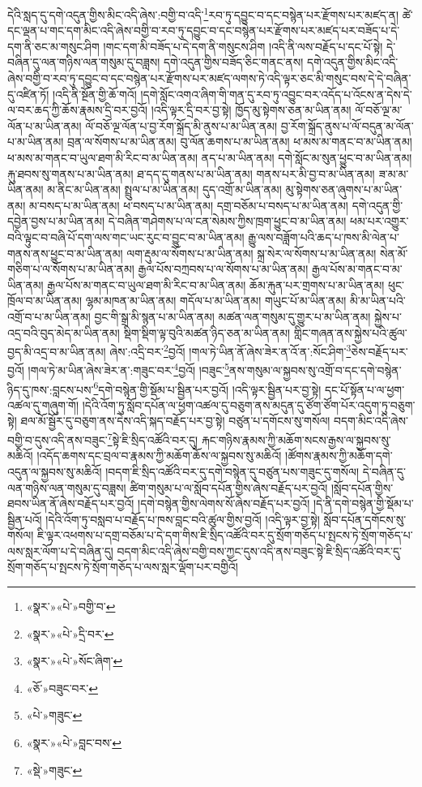 དེའི་སླད་དུ་དགེ་འདུན་གྱིས་མིང་འདི་ཞེས་:བགྱི་བ་འདི་\footnote{«སྣར་»«པེ་»བགྱི་བ་}རབ་ཏུ་དབྱུང་བ་དང་བསྙེན་པར་རྫོགས་པར་མཛད་ན། ཚེ་དང་ལྡན་པ་གང་དག་མིང་འདི་ཞེས་བགྱི་བ་རབ་ཏུ་དབྱུང་བ་དང་བསྙེན་པར་རྫོགས་པར་མཛད་པར་བཟོད་པ་དེ་དག་ནི་ཅང་མ་གསུང་ཤིག །གང་དག་མི་བཟོད་པ་དེ་དག་ནི་གསུངས་ཤིག །འདི་ནི་ལས་བརྗོད་པ་དང་པོ་སྟེ། དེ་བཞིན་དུ་ལན་གཉིས་ལན་གསུམ་དུ་བཟླས། དགེ་འདུན་གྱིས་བཟོད་ཅིང་གནང་ནས། དགེ་འདུན་གྱིས་མིང་འདི་ཞེས་བགྱི་བ་རབ་ཏུ་དབྱུང་བ་དང་བསྙེན་པར་རྫོགས་པར་མཛད་ལགས་ཏེ་འདི་ལྟར་ཅང་མི་གསུང་བས་དེ་དེ་བཞིན་དུ་འཛིན་ཏོ། །འདི་ནི་སྔོན་གྱི་ཆོ་གའོ། །དགེ་སློང་འགའ་ཞིག་གི་གན་དུ་རབ་ཏུ་འབྱུང་བར་འདོད་པ་འོངས་ན་དེས་དེ་ལ་བར་ཆད་ཀྱི་ཆོས་རྣམས་དྲི་བར་བྱའོ། །འདི་ལྟར་དྲི་བར་བྱ་སྟེ། ཁྱོད་མུ་སྟེགས་ཅན་མ་ཡིན་ནམ། ལོ་བཅོ་ལྔ་མ་ལོན་པ་མ་ཡིན་ནམ། ལོ་བཅོ་ལྔ་ལོན་པ་བྱ་རོག་སྐྲོད་མི་ནུས་པ་མ་ཡིན་ནམ། བྱ་རོག་སྐྲོད་ནུས་པ་ལོ་བདུན་མ་ལོན་པ་མ་ཡིན་ནམ། བྲན་ལ་སོགས་པ་མ་ཡིན་ནམ། བུ་ལོན་ཆགས་པ་མ་ཡིན་ནམ། ཕ་མས་མ་གནང་བ་མ་ཡིན་ནམ། ཕ་མས་མ་གནང་བ་ཡུལ་ཐག་མི་རིང་བ་མ་ཡིན་ནམ། ནད་པ་མ་ཡིན་ནམ། དགེ་སློང་མ་སུན་ཕྱུང་བ་མ་ཡིན་ནམ། རྐུ་ཐབས་སུ་གནས་པ་མ་ཡིན་ནམ། ཐ་དད་དུ་གནས་པ་མ་ཡིན་ནམ། གནས་པར་མི་བྱ་བ་མ་ཡིན་ནམ། ཟ་མ་མ་ཡིན་ནམ། མ་ནིང་མ་ཡིན་ནམ། སྤྲུལ་པ་མ་ཡིན་ནམ། དུད་འགྲོ་མ་ཡིན་ནམ། མུ་སྟེགས་ཅན་ཞུགས་པ་མ་ཡིན་ནམ། མ་བསད་པ་མ་ཡིན་ནམ། ཕ་བསད་པ་མ་ཡིན་ནམ། དགྲ་བཅོམ་པ་བསད་པ་མ་ཡིན་ནམ། དགེ་འདུན་གྱི་དབྱེན་བྱས་པ་མ་ཡིན་ནམ། དེ་བཞིན་གཤེགས་པ་ལ་ངན་སེམས་ཀྱིས་ཁྲག་ཕྱུང་བ་མ་ཡིན་ནམ། ཕམ་པར་འགྱུར་བའི་ལྟུང་བ་བཞི་པོ་དག་ལས་གང་ཡང་རུང་བ་བྱུང་བ་མ་ཡིན་ནམ། རྒྱུ་ལས་བཟློག་པའི་ཆད་པ་ཁས་མི་ལེན་པ་གནས་ནས་ཕྱུང་བ་མ་ཡིན་ནམ། ལག་རྡུམ་ལ་སོགས་པ་མ་ཡིན་ནམ། སྐྲ་སེར་ལ་སོགས་པ་མ་ཡིན་ནམ། སེན་མོ་གཅིག་པ་ལ་སོགས་པ་མ་ཡིན་ནམ། རྒྱལ་པོས་བཀྲབས་པ་ལ་སོགས་པ་མ་ཡིན་ནམ། རྒྱལ་པོས་མ་གནང་བ་མ་ཡིན་ནམ། རྒྱལ་པོས་མ་གནང་བ་ཡུལ་ཐག་མི་རིང་བ་མ་ཡིན་ནམ། ཆོམ་རྐུན་པར་གྲགས་པ་མ་ཡིན་ནམ། ཕུང་ཁྲོལ་བ་མ་ཡིན་ནམ། ལྷམ་མཁན་མ་ཡིན་ནམ། གདོལ་པ་མ་ཡིན་ནམ། གཡུང་པོ་མ་ཡིན་ནམ། མི་མ་ཡིན་པའི་འགྲོ་བ་པ་མ་ཡིན་ནམ། བྱང་གི་སྒྲ་མི་སྙན་པ་མ་ཡིན་ནམ། མཚན་ལན་གསུམ་དུ་གྱུར་པ་མ་ཡིན་ནམ། སྐྱེས་པ་འདྲ་བའི་བུད་མེད་མ་ཡིན་ནམ། སྡིག་སྡིག་ལྟ་བུའི་མཚན་ཉིད་ཅན་མ་ཡིན་ནམ། གླིང་གཞན་ནས་སྐྱེས་པའི་ཚུལ་བྱད་མི་འདྲ་བ་མ་ཡིན་ནམ། ཞེས་:འདྲི་བར་\footnote{«སྣར་»«པེ་»དྲི་བར་}བྱའོ། །གལ་ཏེ་ཡིན་ནོ་ཞེས་ཟེར་ན་འོ་ན་:སོང་ཤིག་\footnote{«སྣར་»«པེ་»སོང་ཞིག་}ཅེས་བརྗོད་པར་བྱའོ། །གལ་ཏེ་མ་ཡིན་ཞེས་ཟེར་ན་:གཟུང་བར་\footnote{«ཅོ་»བཟུང་བར་}བྱའོ། །བཟུང་\footnote{«པེ་»གཟུང་}ནས་གསུམ་ལ་སྐྱབས་སུ་འགྲོ་བ་དང་དགེ་བསྙེན་ཉིད་དུ་ཁས་:བླངས་པས་\footnote{«སྣར་»«པེ་»བླང་བས་}དགེ་བསྙེན་གྱི་སྡོམ་པ་སྦྱིན་པར་བྱའོ། །འདི་ལྟར་སྦྱིན་པར་བྱ་སྟེ། དང་པོ་སྟོན་པ་ལ་ཕྱག་འཚལ་དུ་གཞུག་གོ། །དེའི་འོག་ཏུ་སློབ་དཔོན་ལ་ཕྱག་འཚལ་དུ་བཅུག་ནས་མདུན་དུ་ཙོག་ཙོག་པོར་འདུག་ཏུ་བཅུག་སྟེ། ཐལ་མོ་སྦྱོར་དུ་བཅུག་ནས་དེས་འདི་སྐད་བརྗོད་པར་བྱ་སྟེ། བཙུན་པ་དགོངས་སུ་གསོལ། བདག་མིང་འདི་ཞེས་བགྱི་བ་དུས་འདི་ནས་བཟུང་\footnote{«སྡེ་»གཟུང་}སྟེ་ཇི་སྲིད་འཚོའི་བར་དུ། རྐང་གཉིས་རྣམས་ཀྱི་མཆོག་སངས་རྒྱས་ལ་སྐྱབས་སུ་མཆིའོ། །འདོད་ཆགས་དང་བྲལ་བ་རྣམས་ཀྱི་མཆོག་ཆོས་ལ་སྐྱབས་སུ་མཆིའོ། །ཚོགས་རྣམས་ཀྱི་མཆོག་དགེ་འདུན་ལ་སྐྱབས་སུ་མཆིའོ། །བདག་ཇི་སྲིད་འཚོའི་བར་དུ་དགེ་བསྙེན་དུ་བཙུན་པས་གཟུང་དུ་གསོལ། དེ་བཞིན་དུ་ལན་གཉིས་ལན་གསུམ་དུ་བཟླས། ཚིག་གསུམ་པ་ལ་སློབ་དཔོན་གྱིས་ཞེས་བརྗོད་པར་བྱའོ། །སློབ་དཔོན་གྱིས་ཐབས་ཡིན་ནོ་ཞེས་བརྗོད་པར་བྱའོ། །དགེ་བསྙེན་གྱིས་ལེགས་སོ་ཞེས་བརྗོད་པར་བྱའོ། །དེ་ནི་དགེ་བསྙེན་གྱི་སྡོམ་པ་སྦྱིན་པའོ། །དེའི་འོག་ཏུ་བསླབ་པ་བརྗོད་པ་ཁས་བླང་བའི་ཚུལ་གྱིས་བྱའོ། །འདི་ལྟར་བྱ་སྟེ། སློབ་དཔོན་དགོངས་སུ་གསོལ། ཇི་ལྟར་འཕགས་པ་དགྲ་བཅོམ་པ་དེ་དག་གིས་ཇི་སྲིད་འཚོའི་བར་དུ་སྲོག་གཅོད་པ་སྤངས་ཏེ་སྲོག་གཅོད་པ་ལས་སླར་ལོག་པ་དེ་བཞིན་དུ། བདག་མིང་འདི་ཞེས་བགྱི་བས་ཀྱང་དུས་འདི་ནས་བཟུང་སྟེ་ཇི་སྲིད་འཚོའི་བར་དུ་སྲོག་གཅོད་པ་སྤངས་ཏེ་སྲོག་གཅོད་པ་ལས་སླར་ལྡོག་པར་བགྱིའོ། 